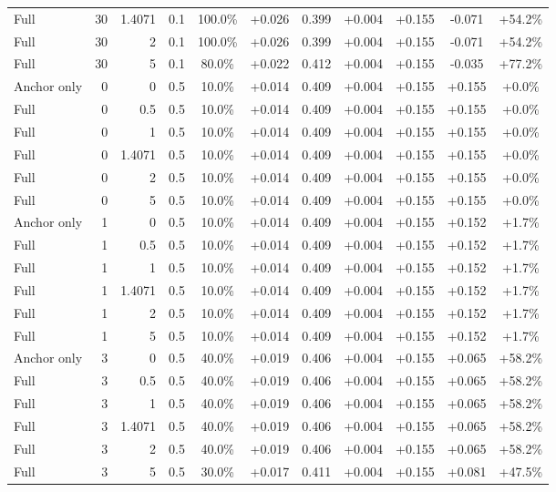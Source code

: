 \begin{table}[htbp]
\begin{tabular}{lrrrccccccc}
Full & 30 & 1.4071 & 0.1 & 100.0\% & +0.026 & 0.399 & +0.004 & +0.155 & -0.071 & +54.2\% \\
Full & 30 & 2 & 0.1 & 100.0\% & +0.026 & 0.399 & +0.004 & +0.155 & -0.071 & +54.2\% \\
Full & 30 & 5 & 0.1 & 80.0\% & +0.022 & 0.412 & +0.004 & +0.155 & -0.035 & +77.2\% \\
Anchor only & 0 & 0 & 0.5 & 10.0\% & +0.014 & 0.409 & +0.004 & +0.155 & +0.155 & +0.0\% \\
Full & 0 & 0.5 & 0.5 & 10.0\% & +0.014 & 0.409 & +0.004 & +0.155 & +0.155 & +0.0\% \\
Full & 0 & 1 & 0.5 & 10.0\% & +0.014 & 0.409 & +0.004 & +0.155 & +0.155 & +0.0\% \\
Full & 0 & 1.4071 & 0.5 & 10.0\% & +0.014 & 0.409 & +0.004 & +0.155 & +0.155 & +0.0\% \\
Full & 0 & 2 & 0.5 & 10.0\% & +0.014 & 0.409 & +0.004 & +0.155 & +0.155 & +0.0\% \\
Full & 0 & 5 & 0.5 & 10.0\% & +0.014 & 0.409 & +0.004 & +0.155 & +0.155 & +0.0\% \\
Anchor only & 1 & 0 & 0.5 & 10.0\% & +0.014 & 0.409 & +0.004 & +0.155 & +0.152 & +1.7\% \\
Full & 1 & 0.5 & 0.5 & 10.0\% & +0.014 & 0.409 & +0.004 & +0.155 & +0.152 & +1.7\% \\
Full & 1 & 1 & 0.5 & 10.0\% & +0.014 & 0.409 & +0.004 & +0.155 & +0.152 & +1.7\% \\
Full & 1 & 1.4071 & 0.5 & 10.0\% & +0.014 & 0.409 & +0.004 & +0.155 & +0.152 & +1.7\% \\
Full & 1 & 2 & 0.5 & 10.0\% & +0.014 & 0.409 & +0.004 & +0.155 & +0.152 & +1.7\% \\
Full & 1 & 5 & 0.5 & 10.0\% & +0.014 & 0.409 & +0.004 & +0.155 & +0.152 & +1.7\% \\
Anchor only & 3 & 0 & 0.5 & 40.0\% & +0.019 & 0.406 & +0.004 & +0.155 & +0.065 & +58.2\% \\
Full & 3 & 0.5 & 0.5 & 40.0\% & +0.019 & 0.406 & +0.004 & +0.155 & +0.065 & +58.2\% \\
Full & 3 & 1 & 0.5 & 40.0\% & +0.019 & 0.406 & +0.004 & +0.155 & +0.065 & +58.2\% \\
Full & 3 & 1.4071 & 0.5 & 40.0\% & +0.019 & 0.406 & +0.004 & +0.155 & +0.065 & +58.2\% \\
Full & 3 & 2 & 0.5 & 40.0\% & +0.019 & 0.406 & +0.004 & +0.155 & +0.065 & +58.2\% \\
Full & 3 & 5 & 0.5 & 30.0\% & +0.017 & 0.411 & +0.004 & +0.155 & +0.081 & +47.5\% \\

\end{tabular}
\end{table}
